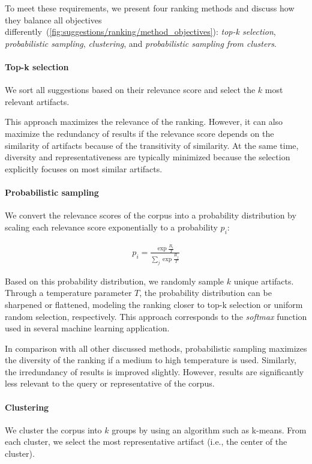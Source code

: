 To meet these requirements, we present four ranking methods and discuss how they balance all objectives differently~(\cref{fig:suggestions/ranking/method_objectives}): \emph{top-k selection}, \emph{probabilistic sampling}, \emph{clustering}, and \emph{probabilistic sampling from clusters}.

\paragraph{Top-k selection}
We sort all suggestions based on their relevance score and select the $k$ most relevant artifacts.

This approach maximizes the relevance of the ranking.
However, it can also maximize the redundancy of results if the relevance score depends on the similarity of artifacts because of the transitivity of similarity.
At the same time, diversity and representativeness are typically minimized because the selection explicitly focuses on most similar artifacts.

\paragraph{Probabilistic sampling}
We convert the relevance scores of the corpus into a probability distribution by scaling each relevance score exponentially to a probability $p_i$:

\begin{align*}
	p_i = \frac{\exp \frac{R_i}{T}}{\sum_j \exp \frac{R_j}{T}}
\end{align*}

Based on this probability distribution, we randomly sample $k$ unique artifacts.
Through a temperature parameter $T$, the probability distribution can be sharpened or flattened, modeling the ranking closer to top-k selection or uniform random selection, respectively.
This approach corresponds to the \emph{softmax} function used in several machine learning application.

In comparison with all other discussed methods, probabilistic sampling maximizes the diversity of the ranking if a medium to high temperature is used.
Similarly, the irredundancy of results is improved slightly.
However, results are significantly less relevant to the query or representative of the corpus.

\paragraph{Clustering}
We cluster the corpus into $k$ groups by using an algorithm such as k-means.
From each cluster, we select the most representative artifact (i.e., the center of the cluster).

